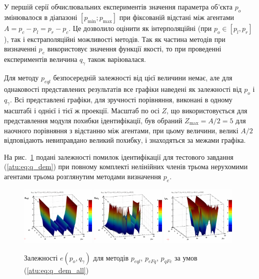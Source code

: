 У першій серії обчислювальних експериментів значення параметра об'єкта $p_o$
змінювалося в діапазоні $[p_{\min}; p_{\max}]$ при фіксованій відстані
між агентами $A = p_c - p_l = p_r - p_c$. Це дозволило оцінити як
інтерполяційні (при $p_o \in [p_l, p_r]$), так і екстраполяційні можливості
методів. Так як частина методів при визначенні $p_e$ використовує значення
функції якості, то при проведенні експериментів величина $q_\gamma$ також
варіювалася.

Для методу
$ p_{eql} $ безпосередній залежності від цієї величини немає, але
для однаковості представлених результатів все графіки наведені
як залежності від
$ p_o $ і
$ q_\gamma $. Всі представлені графіки, для зручності порівняння,
виконані в одному масштабі і однієї і тієї ж проекції. Масштаб
по осі
$ Z $, що використовується для представлення модуля похибки
ідентифікації, був обраний
$ Z_{\max} = A / 2 = 5 $ для наочного порівняння з відстанню між агентами,
при цьому величини, великі
$ A / 2 $ відповідають невиправдано великий похибку, і знаходяться
за межами графіка.

На рис.~\ref{atu:f:qsl_pe_po_qg_all} подані залежності помилок
ідентифікації для тестового завдання (\ref{atu:eq:q_dem}) при повному
комплекті нелінійних членів  трьома нерухомими
агентами трьома розглянутим методами визначення $p_e$.

\begin{figure}[htb!]
  \begin{center}
    \includegraphics[width=0.32\textwidth]{p/qls_pe-p_po_qg_eql_all.png}
    \hfill
    \includegraphics[width=0.32\textwidth]{p/qls_pe-p_po_qg_eFq_all.png}
    \hfill
    \includegraphics[width=0.32\textwidth]{p/qls_pe-p_po_qg_eFc_all.png}
  \end{center}
  \caption{Залежності $e(p_o,q_\gamma)$ для методів $p_{eql}$, $p_{eFq}$, $p_{qFc}$ за умов (\ref{atu:eq:q_dem_all})}
  \label{atu:f:qsl_pe_po_qg_all}
\end{figure}

